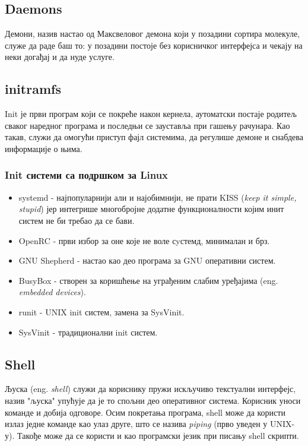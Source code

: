\documentclass[a4paper,14pt]{article}
\begin{document}
\subsection{Daemons}
Демони\cite{daemon}, назив настао од Максвеловог демона који у позадини сортира молекуле, служе да раде баш то: у позадини постоје без корисничког интерфејса и чекају на неки догађај и да нуде услуге.

\subsection{initramfs}
Init је први програм који се покреће након кернела, аутоматски постаје родитељ сваког наредног програма и последњи се зауставља при гашењу рачунара. Као такав, служи да омогући приступ фајл системима, да регулише демоне и снабдева информације о њима.
\subsubsection{Init системи са подршком за  Linux}
\begin{itemize}
\item systemd - најпопуларнији али и најобимнији, не прати KISS (\textit{keep it simple, stupid}) јер интегрише многобројне додатне функционалности којим инит систем не би требао да се бави.
\item OpenRC - први избор за оне које не воле сyстемд, минималан и брз.
\item GNU Shepherd - настао као део програма за GNU оперативни систем.
\item BusyBox - створен за коришћење на уграђеним слабим уређајима (eng. \textit{embedded devices}).
\item runit - UNIX init систем, замена за SysVinit.
\item SysVinit - традиционални init систем.
\end{itemize}
\newpage

\subsection{Shell}
Љуска (eng. \textit{shell}) служи да кориснику пружи искључиво текстуални интерфејс, назив "љуска" упућује да је то спољни део оперативног система. Корисник уноси команде и добија одговоре. Осим покретања програма, shell може да користи излаз једне команде као улаз друге, што се назива \textit{piping} (прво уведен у UNIX-у). Такође може да се користи и као програмски језик при писању shell скрипти.
\end{document}
